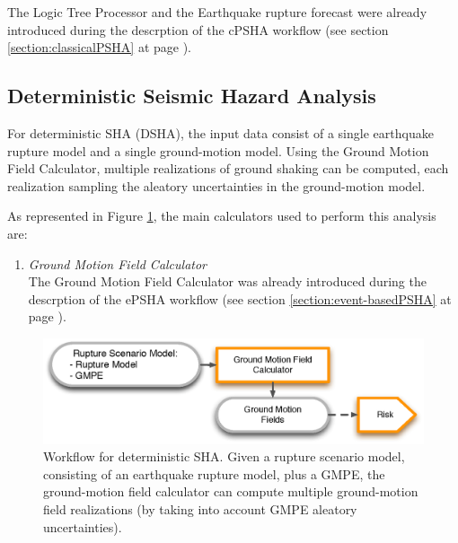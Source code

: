 The Logic Tree Processor and the Earthquake rupture forecast were already 
introduced during the descrption of the cPSHA workflow (see section 
\ref{section:classicalPSHA} at page \pageref{section:classicalPSHA}).
%
\subsection{Deterministic Seismic Hazard Analysis}
\label{section:deterministicSHA}
For deterministic SHA (DSHA), the input data consist of a single earthquake 
rupture model and a single ground-motion model. Using the Ground Motion Field 
Calculator, multiple realizations of ground shaking can be computed, each 
realization sampling the aleatory uncertainties in the ground-motion model.

As represented in Figure \ref{deterministic_workflow}, the main calculators 
used to perform this analysis are:
\begin{enumerate}
\item \emph{Ground Motion Field Calculator} \hfill \\
The Ground Motion Field Calculator was already 
introduced during the descrption of the ePSHA workflow (see section 
\ref{section:event-basedPSHA} at page \pageref{section:classicalPSHA}).
\end{enumerate}
\begin{figure}[!hb]
\centering
\includegraphics[width=14cm]{./figures/deterministic_workflow.eps}
\caption{Workflow for deterministic SHA. Given a rupture scenario model, 
consisting of an earthquake rupture model, plus a GMPE, the ground-motion 
field calculator can compute multiple ground-motion field realizations (by 
taking into account GMPE aleatory uncertainties).}
\label{deterministic_workflow}
\end{figure}



\cleardoublepage

